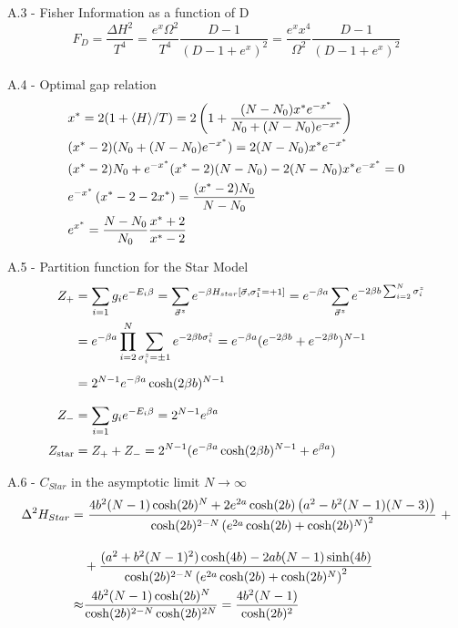 \documentclass{article}
\begin{document}
A.3 - Fisher Information as a function of D\\
\begin{equation}
    F_D = \frac{\Delta H^2}{T^4} = \frac{e^x\Omega^2}{T^4}\frac{D-1}{(D-1+e^x)^2}=\frac{e^x x^4}{\Omega^2}\frac{D-1}{(D-1+e^x)^2}
    \label{A3}
\end{equation}\\

A.4 - Optimal gap relation
\begin{align}
    &x^*=2(1+\langle H \rangle/T) = 2\left(1 + \frac{(N-N_0)x^* e^{-x^*}}{N_0+(N-N_0)e^{-x^*}}\right)\notag\\
    &(x^*-2)(N_0+(N-N_0)e^{-x^*})=2(N-N_0)x^* e^{-x^*}\notag\\
    &(x^*-2)N_0 + e^{-x^*} (x^*-2)(N-N_0) -2(N-N_0)x^* e^{-x^*} = 0 \notag\\
    &e^{-x^*}\left(x^*-2-2x^*\right)=\frac{(x^*-2)N_0}{N-N_0} \notag\\
    &e^{x^*} = \frac{N-N_0}{N_0}\frac{x^*+2}{x^*-2}
    \label{A4}
\end{align}

A.5 - Partition function for the Star Model
\begin{align}
    Z_+
    &=\sum_{i=1}g_ie^{-E_i\beta}=\sum_{\vec{\sigma}^z}e^{-\beta H_{star}[\vec{\sigma},\sigma_1^z=+1]}=e^{-\beta a}\sum_{\vec{\sigma}^z}e^{-2\beta b \sum_{i=2}^N \sigma_i^z}\notag \\\notag 
    &=e^{-\beta a}\prod_{i=2}^N\sum_{\sigma_i^z=\pm1}e^{-2\beta b\sigma_i^z}=e^{-\beta a}(e^{-2\beta b}+e^{-2\beta b})^{N-1} \\[5pt] \notag 
    &= 2^{N-1}e^{-\beta a}\cosh(2\beta b)^{N-1}\\[7pt]\notag
    Z_-
    &=\sum_{i=1}g_ie^{-E_i\beta}=2^{N-1}e^{\beta a}\\[2pt]
    Z_{\text{star}}
    &=Z_+ + Z_-=2^{N-1}(e^{-\beta a}\cosh(2\beta b )^{N-1}+e^{\beta a}) 
    \label{Z_star_A}
\end{align}

A.6 - $C_{Star}$ in the asymptotic limit $N\to\infty$
\begin{align}
    \Delta^2H_{Star} =&\,\,\frac{4b^2 (N-1) \cosh(2b)^N + 2e^{2a} \cosh(2b) \left( a^2 - b^2 (N-1)(N-3)\right)}{\cosh(2b)^{2-N} \left( e^{2a} \cosh(2b) + \cosh(2b)^N \right)^2}\,\,+\notag\\[10pt]
   &+ \frac{(a^2 + b^2 (N-1)^2) \cosh(4b) - 2ab(N-1) \sinh(4b)}{\cosh(2b)^{2-N} \left( e^{2a} \cosh(2b) + \cosh(2b)^N \right)^2} \label{A6} \\ \notag
   \approx&\frac{4b^2(N-1)\cosh(2b)^N}{\cosh(2b)^{2-N}\cosh(2b)^{2N}} = \frac{4b^2(N-1)}{\cosh(2b)^{2}}
\end{align}
\end{document}
